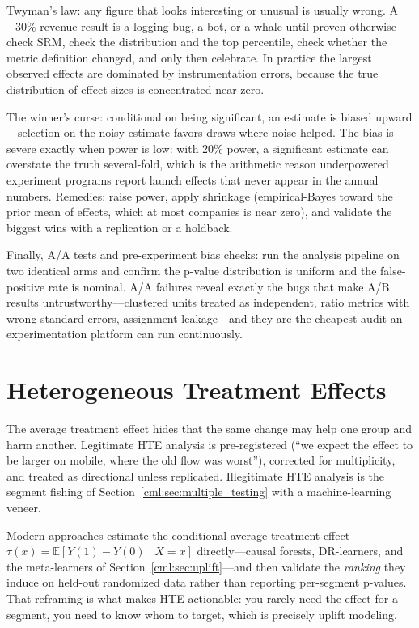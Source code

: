 Twyman's law: any figure that looks interesting or unusual is usually wrong. A +30\% revenue result is a logging bug, a bot, or a whale until proven otherwise---check SRM, check the distribution and the top percentile, check whether the metric definition changed, and only then celebrate. In practice the largest observed effects are dominated by instrumentation errors, because the true distribution of effect sizes is concentrated near zero.

The winner's curse: conditional on being significant, an estimate is biased upward---selection on the noisy estimate favors draws where noise helped. The bias is severe exactly when power is low: with 20\% power, a significant estimate can overstate the truth several-fold, which is the arithmetic reason underpowered experiment programs report launch effects that never appear in the annual numbers. Remedies: raise power, apply shrinkage (empirical-Bayes toward the prior mean of effects, which at most companies is near zero), and validate the biggest wins with a replication or a holdback.

Finally, A/A tests and pre-experiment bias checks: run the analysis pipeline on two identical arms and confirm the p-value distribution is uniform and the false-positive rate is nominal. A/A failures reveal exactly the bugs that make A/B results untrustworthy---clustered units treated as independent, ratio metrics with wrong standard errors, assignment leakage---and they are the cheapest audit an experimentation platform can run continuously.

\section{Heterogeneous Treatment Effects}
\label{cml:sec:hte}

The average treatment effect hides that the same change may help one group and harm another. Legitimate HTE analysis is pre-registered (``we expect the effect to be larger on mobile, where the old flow was worst''), corrected for multiplicity, and treated as directional unless replicated. Illegitimate HTE analysis is the segment fishing of Section~\ref{cml:sec:multiple_testing} with a machine-learning veneer.

Modern approaches estimate the conditional average treatment effect $\tau(x) = \mathbb{E}[Y(1) - Y(0) \mid X = x]$ directly---causal forests, DR-learners, and the meta-learners of Section~\ref{cml:sec:uplift}---and then validate the \emph{ranking} they induce on held-out randomized data rather than reporting per-segment p-values. That reframing is what makes HTE actionable: you rarely need the effect for a segment, you need to know whom to target, which is precisely uplift modeling.

